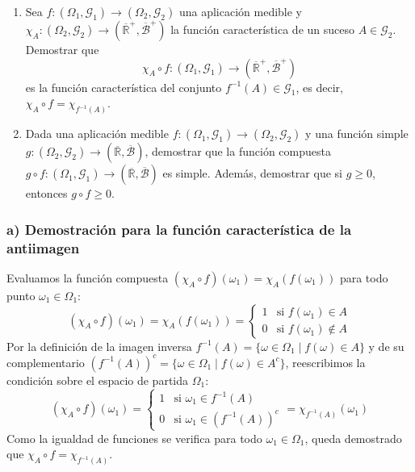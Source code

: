 \newpage
\begin{problema}
\begin{enumerate}[label=\alph*)]
    \item Sea $f : (\Omega_1, \mathcal{G}_1) \to (\Omega_2, \mathcal{G}_2)$ una aplicación medible y $\chi_A : (\Omega_2, \mathcal{G}_2) \to (\overline{\mathbb{R}}^+, \overline{\mathcal{B}}^+)$ la función característica de un suceso $A \in \mathcal{G}_2$. Demostrar que
    \[
        \chi_A \circ f : (\Omega_1, \mathcal{G}_1) \to (\overline{\mathbb{R}}^+, \overline{\mathcal{B}}^+)
    \]
    es la función característica del conjunto $f^{-1}(A) \in \mathcal{G}_1$, es decir, $\chi_A \circ f = \chi_{f^{-1}(A)}$.
    \item Dada una aplicación medible $f : (\Omega_1, \mathcal{G}_1) \to (\Omega_2, \mathcal{G}_2)$ y una función simple $g : (\Omega_2, \mathcal{G}_2) \to (\overline{\mathbb{R}}, \overline{\mathcal{B}})$, demostrar que la función compuesta $g \circ f : (\Omega_1, \mathcal{G}_1) \to (\overline{\mathbb{R}}, \overline{\mathcal{B}})$ es simple. Además, demostrar que si $g \ge 0$, entonces $g \circ f \ge 0$.
\end{enumerate}

\tcblower

\subsubsection*{a) Demostración para la función característica de la antiimagen}
Evaluamos la función compuesta $(\chi_A \circ f)(\omega_1) = \chi_A(f(\omega_1))$ para todo punto $\omega_1 \in \Omega_1$:
\[
    (\chi_A \circ f)(\omega_1) = \chi_A(f(\omega_1)) = \begin{cases} 
        1 & \text{si } f(\omega_1) \in A \\ 
        0 & \text{si } f(\omega_1) \notin A 
    \end{cases}
\]
Por la definición de la imagen inversa $f^{-1}(A) = \{\omega \in \Omega_1 \mid f(\omega) \in A\}$ y de su complementario $(f^{-1}(A))^c = \{\omega \in \Omega_1 \mid f(\omega) \in A^c\}$, reescribimos la condición sobre el espacio de partida $\Omega_1$:
\[
    (\chi_A \circ f)(\omega_1) = \begin{cases} 
        1 & \text{si } \omega_1 \in f^{-1}(A) \\ 
        0 & \text{si } \omega_1 \in (f^{-1}(A))^c 
    \end{cases} = \chi_{f^{-1}(A)}(\omega_1)
\]
Como la igualdad de funciones se verifica para todo $\omega_1 \in \Omega_1$, queda demostrado que $\chi_A \circ f = \chi_{f^{-1}(A)}$.


\end{problema}
